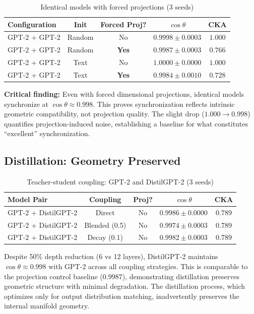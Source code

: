 \documentclass[10pt]{article} %
\theoremstyle{plain}
\theoremstyle{definition}
\theoremstyle{remark}
\begin{document}
\begin{table}[htbp]
\centering
\caption{Identical models with forced projections (3 seeds)}
\label{tab:projection_control}
\small
\begin{tabular}{lcccc}
\toprule
\textbf{Configuration} & \textbf{Init} & \textbf{Forced Proj?} & \textbf{$\cos \theta$} & \textbf{CKA} \\
\midrule
GPT-2 + GPT-2 & Random & No & $0.9998 \pm 0.0003$ & $1.000$ \\
GPT-2 + GPT-2 & Random & \textbf{Yes} & $\mathbf{0.9987 \pm 0.0003}$ & $0.766$ \\
\midrule
GPT-2 + GPT-2 & Text & No & $1.0000 \pm 0.0000$ & $1.000$ \\
GPT-2 + GPT-2 & Text & \textbf{Yes} & $\mathbf{0.9984 \pm 0.0010}$ & $0.728$ \\
\bottomrule
\end{tabular}
\end{table}

\textbf{Critical finding:} Even with forced dimensional projections, identical models synchronize at $\cos \theta \approx 0.998$. This proves synchronization reflects intrinsic geometric compatibility, not projection quality. The slight drop ($1.000 \to 0.998$) quantifies projection-induced noise, establishing a baseline for what constitutes ``excellent'' synchronization.

\subsection{Distillation: Geometry Preserved}

\begin{table}[htbp]
\centering
\caption{Teacher-student coupling: GPT-2 and DistilGPT-2 (3 seeds)}
\label{tab:distill}
\small
\begin{tabular}{lcccc}
\toprule
\textbf{Model Pair} & \textbf{Coupling} & \textbf{Proj?} & \textbf{$\cos \theta$} & \textbf{CKA} \\
\midrule
GPT-2 + DistilGPT-2 & Direct & No & $\mathbf{0.9986 \pm 0.0000}$ & $0.789$ \\
GPT-2 + DistilGPT-2 & Blended (0.5) & No & $\mathbf{0.9974 \pm 0.0003}$ & $0.789$ \\
GPT-2 + DistilGPT-2 & Decay (0.1) & No & $\mathbf{0.9982 \pm 0.0003}$ & $0.789$ \\
\bottomrule
\end{tabular}
\end{table}

Despite 50\% depth reduction (6 vs 12 layers), DistilGPT-2 maintains $\cos \theta \approx 0.998$ with GPT-2 across all coupling strategies. This is comparable to the projection control baseline ($0.9987$), demonstrating distillation preserves geometric structure with minimal degradation. The distillation process, which optimizes only for output distribution matching, inadvertently preserves the internal manifold geometry.
\end{document}
